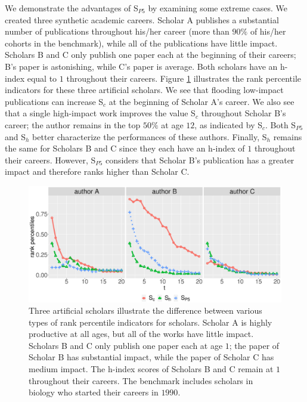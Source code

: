 We demonstrate the advantages of S$_{P5}$ by examining some extreme cases. We created three synthetic academic careers. Scholar A publishes a substantial number of publications throughout his/her career (more than $90\%$ of his/her cohorts in the benchmark), while all of the publications have little impact. Scholars B and C only publish one paper each at the beginning of their careers; B's paper is astonishing, while C's paper is average. Both scholars have an h-index equal to $1$ throughout their careers. Figure \ref{fig:simulated_authors} illustrates the rank percentile indicators for these three artificial scholars. We see that flooding low-impact publications can increase S$_c$ at the beginning of Scholar A's career. We also see that a single high-impact work improves the value S$_c$ throughout Scholar B's career; the author remains in the top $50\%$ at age $12$, as indicated by S$_c$. Both S$_{P5}$ and S$_h$ better characterize the performances of these authors. Finally, S$_h$ remains the same for Scholars B and C since they each have an h-index of $1$ throughout their careers. However, S$_{P5}$ considers that Scholar B's publication has a greater impact and therefore ranks higher than Scholar C. 

\begin{figure}[ht!]
    \centering
    \includegraphics[width=\textwidth]{figures/compare_autrp/simulated_authors.eps}
    \caption[The advantage of S$_{it}^{P5}$ compared to other indicators]{Three artificial scholars illustrate the difference between various types of rank percentile indicators for scholars. Scholar A is highly productive at all ages, but all of the works have little impact. Scholars B and C only publish one paper each at age $1$; the paper of Scholar B has substantial impact, while the paper of Scholar C has medium impact. The h-index scores of Scholars B and C remain at $1$ throughout their careers. The benchmark includes scholars in biology who started their careers in $1990$.}
    \label{fig:simulated_authors}
\end{figure}

